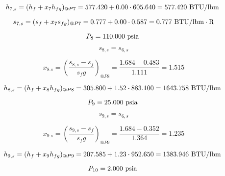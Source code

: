\documentclass{article}
\begin{document}
\begin{equation}
  h_{ 7,s} = (h_{f} + x_{ 7}h_{fg})_{@P 7} =  577.420 + 0.00\cdot 605.640 =  577.420
\textnormal{ BTU/lbm                   }
\end{equation}

\begin{equation}
  s_{ 7,s} = (s_{f} + x_{ 7}s_{fg})_{@P 7} =    0.777 + 0.00\cdot   0.587 =    0.777
\textnormal{ BTU/lbm}\cdot\textnormal{R}
\end{equation}

\begin{equation}
P_{ 8} =  110.000\textnormal{ psia                      }
\end{equation}

\begin{equation}
s_{ 8,s} = s_{ 6,s}
\end{equation}

\begin{equation}
x_{ 8.s} = (\frac{s_{ 8,s} - s_{f}}{s_fg})_{@P 8} = \frac{   1.684 -    0.483}{   1.111} =    1.515
\end{equation}

\begin{equation}
  h_{ 8,s} = (h_{f} + x_{ 8}h_{fg})_{@P 8} =  305.800 + 1.52\cdot 883.100 = 1643.758
\textnormal{ BTU/lbm                   }
\end{equation}

\begin{equation}
P_{ 9} =   25.000\textnormal{ psia                      }
\end{equation}

\begin{equation}
s_{ 9,s} = s_{ 6,s}
\end{equation}

\begin{equation}
x_{ 9.s} = (\frac{s_{ 9,s} - s_{f}}{s_fg})_{@P 9} = \frac{   1.684 -    0.352}{   1.364} =    1.235
\end{equation}

\begin{equation}
  h_{ 9,s} = (h_{f} + x_{ 9}h_{fg})_{@P 9} =  207.585 + 1.23\cdot 952.650 = 1383.946
\textnormal{ BTU/lbm                   }
\end{equation}

\begin{equation}
P_{10} =    2.000\textnormal{ psia                      }
\end{equation}
\end{document}
